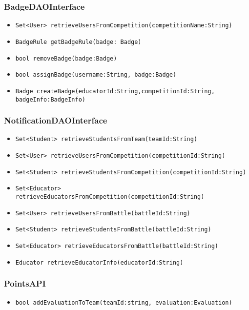 \subsubsection{BadgeDAOInterface}
\begin{itemize}
    \item \texttt{Set<User> retrieveUsersFromCompetition(competitionName:String)}
    \item \texttt{BadgeRule getBadgeRule(badge: Badge)}
    \item \texttt{bool removeBadge(badge:Badge)}
    \item \texttt{bool assignBadge(username:String, badge:Badge)}
    \item \texttt{Badge createBadge(educatorId:String,competitionId:String, badgeInfo:BadgeInfo)}
\end{itemize}

\subsubsection{NotificationDAOInterface}
\begin{itemize}
    \item \texttt{Set<Student> retrieveStudentsFromTeam(teamId:String)}
    \item \texttt{Set<User> retrieveUsersFromCompetition(competitionId:String)}
    \item \texttt{Set<Student> retrieveStudentsFromCompetition(competitionId:String)}
    \item \texttt{Set<Educator> retrieveEducatorsFromCompetition(competitionId:String)}
    \item \texttt{Set<User> retrieveUsersFromBattle(battleId:String)}
    \item \texttt{Set<Student> retrieveStudentsFromBattle(battleId:String)}
    \item \texttt{Set<Educator> retrieveEducatorsFromBattle(battleId:String)}
    \item \texttt{Educator retrieveEducatorInfo(educatorId:String)}
\end{itemize}

\subsubsection{PointsAPI}
\begin{itemize}
    \item \texttt{bool addEvaluationToTeam(teamId:string, evaluation:Evaluation)}
\end{itemize}

